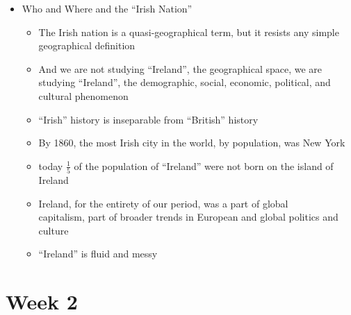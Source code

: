 \documentclass[12pt]{article}
\begin{document}
\begin{itemize}
                \newpage
                \item Who and Where and the ``Irish Nation''
                \begin{itemize}
                    \item The Irish nation is a quasi-geographical term, but it resists any simple geographical definition
                    \item And we are not studying ``Ireland'', the geographical space, we are studying ``Ireland'', the demographic, social, economic, political, and cultural phenomenon
                    \item ``Irish'' history is inseparable from ``British'' history
                    \item By 1860, the most Irish city in the world, by population, was New York
                    \item today $\frac{1}{5}$ of the population of ``Ireland'' were not born on the island of Ireland
                    \item Ireland, for the entirety of our period, was a part of global \\capitalism, part of broader trends in European and global politics and culture
                    \item ``Ireland'' is fluid and messy
                \end{itemize}
            \end{itemize}
    \newpage
    \section{Week 2}
\end{document}
